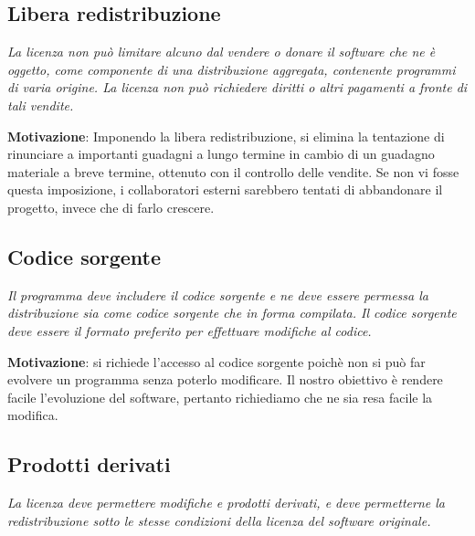 \subsection{Libera redistribuzione}

\begin{center}

\textit{La licenza non può limitare alcuno dal vendere o donare il software che ne è oggetto, come componente di una distribuzione aggregata, contenente programmi di varia origine. La licenza non può richiedere diritti o altri pagamenti a fronte di tali vendite.}

\end{center}

\textbf{Motivazione}: Imponendo la libera redistribuzione, si elimina la tentazione di rinunciare a importanti guadagni a lungo termine in cambio di un guadagno materiale a breve termine, ottenuto con il controllo delle vendite. Se non vi fosse questa imposizione, i collaboratori esterni sarebbero tentati di abbandonare il progetto, invece che di farlo crescere.

\subsection{Codice sorgente}

\begin{center}

\textit{Il programma deve includere il codice sorgente e ne deve essere permessa la distribuzione sia come codice sorgente che in forma compilata. Il codice sorgente deve essere il formato preferito per effettuare modifiche al codice.}

\end{center}

\textbf{Motivazione}: si richiede l'accesso al codice sorgente poichè non si può far evolvere un programma senza poterlo modificare. Il nostro obiettivo è rendere facile l'evoluzione del software, pertanto richiediamo che ne sia resa facile la modifica.

\subsection{Prodotti derivati}

\begin{center}

\textit{La licenza deve permettere modifiche e prodotti derivati, e deve permetterne la redistribuzione sotto le stesse condizioni della licenza del software originale.}

\end{center}

